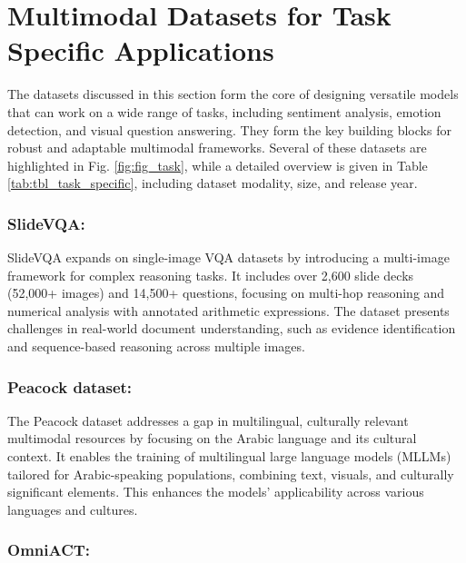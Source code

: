 \documentclass[runningheads]{llncs}
\begin{document}
\begin{table}[h]
{\begin{tabular}{l l c l r}
    		\end{tabular}
    	}
    	
    \end{table}
     
  
	


\section{Multimodal Datasets for Task Specific Applications}

The datasets discussed in this section form the core of designing versatile models that can work on a wide range of tasks, including sentiment analysis, emotion detection, and visual question answering. They form the key building blocks for robust and adaptable multimodal frameworks. Several of these datasets are highlighted in Fig. \ref{fig:fig_task}, while a detailed overview is given in Table \ref{tab:tbl_task_specific}, including dataset modality, size, and release year.


\subsubsection{SlideVQA:}

SlideVQA \cite{ref92} expands on single-image VQA datasets by introducing a multi-image framework for complex reasoning tasks. It includes over 2,600 slide decks (52,000+ images) and 14,500+ questions, focusing on multi-hop reasoning and numerical analysis with annotated arithmetic expressions. The dataset presents challenges in real-world document understanding, such as evidence identification and sequence-based reasoning across multiple images.



\subsubsection{Peacock dataset:}

The Peacock dataset \cite{ref7} addresses a gap in multilingual, culturally relevant multimodal resources by focusing on the Arabic language and its cultural context. It enables the training of multilingual large language models (MLLMs) tailored for Arabic-speaking populations, combining text, visuals, and culturally significant elements. This enhances the models' applicability across various languages and cultures.

\subsubsection{OmniACT:}
\end{document}
